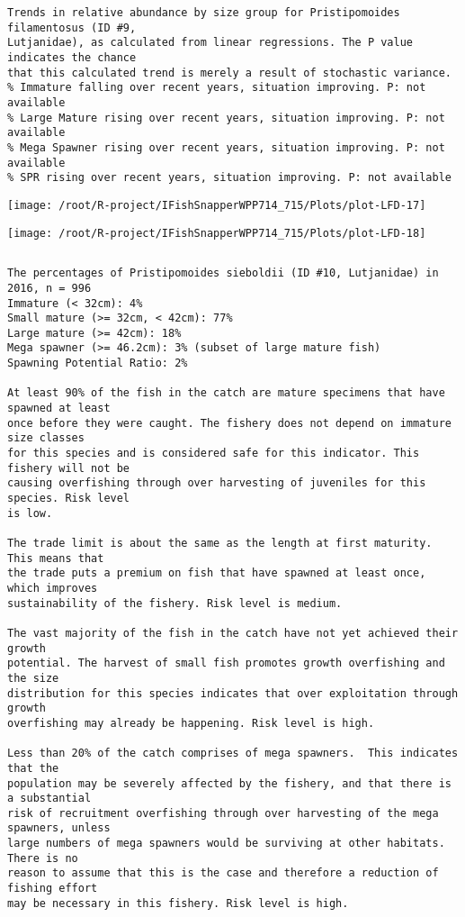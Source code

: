 \documentclass{report}\usepackage[]{graphicx}\usepackage[]{color}
\makeatletter
\def\maxwidth{ %
  \ifdim\Gin@nat@width>\linewidth
    \linewidth
  \else
    \Gin@nat@width
  \fi
}
\newenvironment{kframe}{%
 \def\at@end@of@kframe{}%
 \ifinner\ifhmode%
  \def\at@end@of@kframe{\end{minipage}}%
  \begin{minipage}{\columnwidth}%
 \fi\fi%
 \def\FrameCommand##1{\hskip\@totalleftmargin \hskip-\fboxsep
 \colorbox{shadecolor}{##1}\hskip-\fboxsep
     \hskip-\linewidth \hskip-\@totalleftmargin \hskip\columnwidth}%
 \MakeFramed {\advance\hsize-\width
   \@totalleftmargin\z@ \linewidth\hsize
   \@setminipage}}%
 {\par\unskip\endMakeFramed%
 \at@end@of@kframe}
\newenvironment{knitrout}{}{} %
\makeatother
\begin{document}
\begin{knitrout}
\begin{kframe}
\begin{verbatim}
Trends in relative abundance by size group for Pristipomoides filamentosus (ID #9,
Lutjanidae), as calculated from linear regressions. The P value indicates the chance
that this calculated trend is merely a result of stochastic variance.
% Immature falling over recent years, situation improving. P: not available
% Large Mature rising over recent years, situation improving. P: not available
% Mega Spawner rising over recent years, situation improving. P: not available
% SPR rising over recent years, situation improving. P: not available
\end{verbatim}
\end{kframe}
\texttt{[image: /root/R-project/IFishSnapperWPP714\_715/Plots/plot-LFD-17]} 

\texttt{[image: /root/R-project/IFishSnapperWPP714\_715/Plots/plot-LFD-18]} 
\begin{kframe}\begin{verbatim}
\end{verbatim}
\end{kframe}
\clearpage
\newpage
\begin{kframe}\begin{verbatim}The percentages of Pristipomoides sieboldii (ID #10, Lutjanidae) in 2016, n = 996
Immature (< 32cm): 4%
Small mature (>= 32cm, < 42cm): 77%
Large mature (>= 42cm): 18%
Mega spawner (>= 46.2cm): 3% (subset of large mature fish)
Spawning Potential Ratio: 2%
 
At least 90% of the fish in the catch are mature specimens that have spawned at least
once before they were caught. The fishery does not depend on immature size classes
for this species and is considered safe for this indicator. This fishery will not be
causing overfishing through over harvesting of juveniles for this species. Risk level
is low.

The trade limit is about the same as the length at first maturity.  This means that
the trade puts a premium on fish that have spawned at least once, which improves
sustainability of the fishery. Risk level is medium.

The vast majority of the fish in the catch have not yet achieved their growth
potential. The harvest of small fish promotes growth overfishing and the size
distribution for this species indicates that over exploitation through growth
overfishing may already be happening. Risk level is high.

Less than 20% of the catch comprises of mega spawners.  This indicates that the
population may be severely affected by the fishery, and that there is a substantial
risk of recruitment overfishing through over harvesting of the mega spawners, unless
large numbers of mega spawners would be surviving at other habitats. There is no
reason to assume that this is the case and therefore a reduction of fishing effort
may be necessary in this fishery. Risk level is high.
 

\end{verbatim}
\end{kframe}
\end{knitrout}
\end{document}
